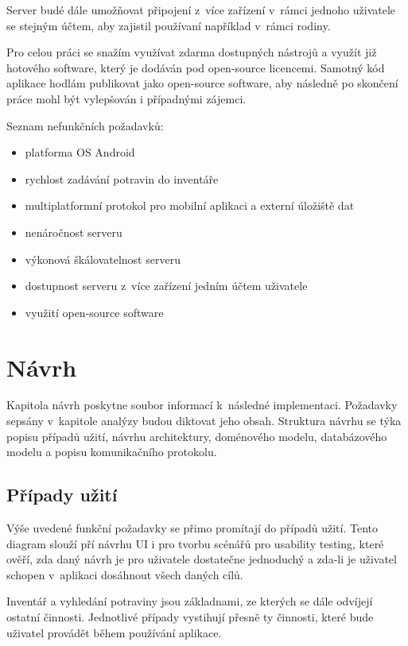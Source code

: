 \documentclass[thesis=B,czech]{FITthesis}[2013/10/20]
\begin{document}
Server budé dále umožňovat připojení z~více zařízení v~rámci jednoho uživatele se stejným účtem, aby zajistil používaní například v~rámci rodiny. 

Pro celou práci se snažím využívat zdarma dostupných nástrojů a využít již hotového software, který je dodáván pod open-source licencemi. Samotný kód aplikace hodlám publikovat jako open-source software, aby následně po skončení práce mohl být vylepšován i případnými zájemci.

Seznam nefunkčních požadavků:

\begin{itemize}
  \item platforma OS Android
  \item rychlost zadávání potravin do inventáře
  \item multiplatformní protokol pro mobilní aplikaci a externí úložiště dat
  \item nenáročnost serveru
  \item výkonová škálovatelnost serveru
  \item dostupnost serveru z~více zařízení jedním účtem uživatele
  \item využití open-source software
\end{itemize}


\chapter{Návrh}

Kapitola návrh poskytne soubor informací k~následné implementaci. Požadavky sepsány v~kapitole analýzy budou diktovat jeho obsah. Struktura návrhu se týka popisu případů užití, návrhu architektury, doménového modelu, databázového modelu a popisu komunikačního protokolu.

\section{Případy užití}

Výše uvedené funkční požadavky se přimo promítají do případů užití. Tento diagram slouží pří návrhu UI i pro tvorbu scénářů pro usability testing, které ověří, zda daný návrh je pro uživatele dostatečne jednoduchý a zda-li je uživatel schopen v~aplikaci dosáhnout všech daných cílů.

Inventář a vyhledání potraviny jsou základnami, ze kterých se dále odvíjejí ostatní činnosti. Jednotlivé případy vystihují přesně ty činnosti, které bude uživatel provádět během používání aplikace.
\end{document}
